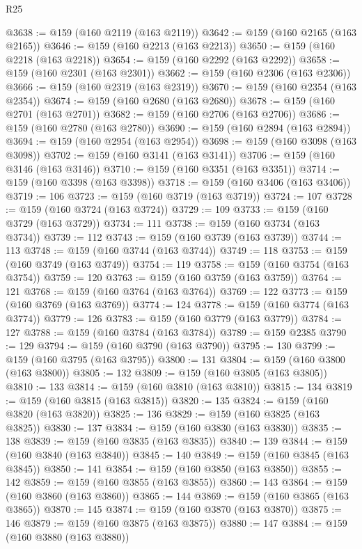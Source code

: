 \begin{lexlean}{R25}
\begin{coremodule}
@3638 := @159 (@160 @2119 (@163 @2119))
@3642 := @159 (@160 @2165 (@163 @2165))
@3646 := @159 (@160 @2213 (@163 @2213))
@3650 := @159 (@160 @2218 (@163 @2218))
@3654 := @159 (@160 @2292 (@163 @2292))
@3658 := @159 (@160 @2301 (@163 @2301))
@3662 := @159 (@160 @2306 (@163 @2306))
@3666 := @159 (@160 @2319 (@163 @2319))
@3670 := @159 (@160 @2354 (@163 @2354))
@3674 := @159 (@160 @2680 (@163 @2680))
@3678 := @159 (@160 @2701 (@163 @2701))
@3682 := @159 (@160 @2706 (@163 @2706))
@3686 := @159 (@160 @2780 (@163 @2780))
@3690 := @159 (@160 @2894 (@163 @2894))
@3694 := @159 (@160 @2954 (@163 @2954))
@3698 := @159 (@160 @3098 (@163 @3098))
@3702 := @159 (@160 @3141 (@163 @3141))
@3706 := @159 (@160 @3146 (@163 @3146))
@3710 := @159 (@160 @3351 (@163 @3351))
@3714 := @159 (@160 @3398 (@163 @3398))
@3718 := @159 (@160 @3406 (@163 @3406))
@3719 := 106
@3723 := @159 (@160 @3719 (@163 @3719))
@3724 := 107
@3728 := @159 (@160 @3724 (@163 @3724))
@3729 := 109
@3733 := @159 (@160 @3729 (@163 @3729))
@3734 := 111
@3738 := @159 (@160 @3734 (@163 @3734))
@3739 := 112
@3743 := @159 (@160 @3739 (@163 @3739))
@3744 := 113
@3748 := @159 (@160 @3744 (@163 @3744))
@3749 := 118
@3753 := @159 (@160 @3749 (@163 @3749))
@3754 := 119
@3758 := @159 (@160 @3754 (@163 @3754))
@3759 := 120
@3763 := @159 (@160 @3759 (@163 @3759))
@3764 := 121
@3768 := @159 (@160 @3764 (@163 @3764))
@3769 := 122
@3773 := @159 (@160 @3769 (@163 @3769))
@3774 := 124
@3778 := @159 (@160 @3774 (@163 @3774))
@3779 := 126
@3783 := @159 (@160 @3779 (@163 @3779))
@3784 := 127
@3788 := @159 (@160 @3784 (@163 @3784))
@3789 := @159 @2385
@3790 := 129
@3794 := @159 (@160 @3790 (@163 @3790))
@3795 := 130
@3799 := @159 (@160 @3795 (@163 @3795))
@3800 := 131
@3804 := @159 (@160 @3800 (@163 @3800))
@3805 := 132
@3809 := @159 (@160 @3805 (@163 @3805))
@3810 := 133
@3814 := @159 (@160 @3810 (@163 @3810))
@3815 := 134
@3819 := @159 (@160 @3815 (@163 @3815))
@3820 := 135
@3824 := @159 (@160 @3820 (@163 @3820))
@3825 := 136
@3829 := @159 (@160 @3825 (@163 @3825))
@3830 := 137
@3834 := @159 (@160 @3830 (@163 @3830))
@3835 := 138
@3839 := @159 (@160 @3835 (@163 @3835))
@3840 := 139
@3844 := @159 (@160 @3840 (@163 @3840))
@3845 := 140
@3849 := @159 (@160 @3845 (@163 @3845))
@3850 := 141
@3854 := @159 (@160 @3850 (@163 @3850))
@3855 := 142
@3859 := @159 (@160 @3855 (@163 @3855))
@3860 := 143
@3864 := @159 (@160 @3860 (@163 @3860))
@3865 := 144
@3869 := @159 (@160 @3865 (@163 @3865))
@3870 := 145
@3874 := @159 (@160 @3870 (@163 @3870))
@3875 := 146
@3879 := @159 (@160 @3875 (@163 @3875))
@3880 := 147
@3884 := @159 (@160 @3880 (@163 @3880))

\end{coremodule}
\end{lexlean}
